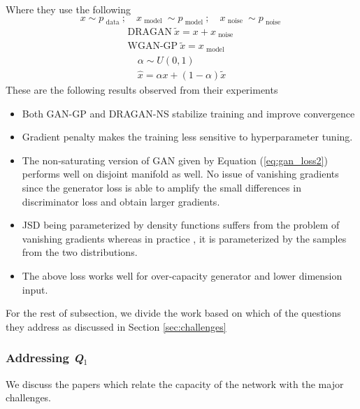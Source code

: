 Where they use the following
$$
x \sim p_{\text { data }} ; \quad x_{\text { model }} \sim p_{\text { model }} ; \quad x_{\text { noise }} \sim p_{\text { noise }}
$$
$$
 \begin{array}{ll}{\text{DRAGAN}}{\ \tilde{x}=x+x_{\text { noise }}} \\ 
{\text{WGAN-GP} \ }{\tilde{x}=x_{\text { model }}}\end{array}
$$
$$
\begin{array}{c}{\alpha \sim U(0,1)} \\ {\hat{x}=\alpha x+(1-\alpha) \tilde{x}}\end{array}
$$
These are the following results observed from their experiments
\begin{itemize}
    \item Both GAN-GP and DRAGAN-NS stabilize training and improve convergence 
    \item Gradient penalty makes the training less sensitive to hyperparameter tuning.
    \item The non-saturating version of GAN given by Equation (\ref{eq:gan_loss2}) performs well on disjoint manifold as well. No issue of vanishing gradients since the generator loss is able to amplify the small differences in discriminator loss and obtain larger gradients. 
    \item JSD being parameterized by density functions suffers from the problem of vanishing gradients whereas in practice , it is parameterized by the samples from the two distributions.
    \item The above loss works well for over-capacity generator and lower dimension input.
\end{itemize}{}

\bigskip

For the rest of subsection, we divide the work based on which of the questions they address as discussed in Section \ref{sec:challenges}
\subsubsection{Addressing \emph{Q$_1$}} \label{subsubsec:theory_q1} We discuss the papers which relate the capacity of the network with the major challenges.
